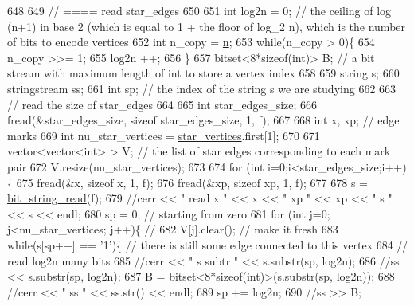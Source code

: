 \begin{DoxyCode}
648 
649   \textcolor{comment}{// ==== read star\_edges}
650 
651   \textcolor{keywordtype}{int} log2n = 0; \textcolor{comment}{// the ceiling of log (n+1) in base 2 (which is equal to 1 + the floor of log\_2 n), which
       is the number of bits to encode vertices}
652   \textcolor{keywordtype}{int} n\_copy = \hyperlink{classmarked__graph__compressed_a8d841016ddb11cfd33748c8deb6277ba}{n};
653   \textcolor{keywordflow}{while}(n\_copy > 0)\{
654     n\_copy >>= 1;
655     log2n ++;
656   \}
657   bitset<8*sizeof(int)> B; \textcolor{comment}{// a bit stream with maximum length of int to store a vertex index}
658 
659   \textcolor{keywordtype}{string} s;
660   stringstream ss;
661   \textcolor{keywordtype}{int} sp; \textcolor{comment}{// the index of the string s we are studying }
662 
663   \textcolor{comment}{// read the size of star\_edges}
664 
665   \textcolor{keywordtype}{int} star\_edges\_size;
666   fread(&star\_edges\_size, \textcolor{keyword}{sizeof} star\_edges\_size, 1, f);
667 
668   \textcolor{keywordtype}{int} x, xp; \textcolor{comment}{// edge marks}
669   \textcolor{keywordtype}{int} nu\_star\_vertices = \hyperlink{classmarked__graph__compressed_a7a4ced4586e2e353f9076bd447df5208}{star\_vertices}.first[1];
670 
671   vector<vector<int> > V; \textcolor{comment}{// the list of star edges corresponding to each mark pair}
672   V.resize(nu\_star\_vertices);
673 
674   \textcolor{keywordflow}{for} (\textcolor{keywordtype}{int} i=0;i<star\_edges\_size;i++)\{
675     fread(&x, \textcolor{keyword}{sizeof} x, 1, f);
676     fread(&xp, \textcolor{keyword}{sizeof} xp, 1, f);
677   
678     s = \hyperlink{compression__helper_8cpp_a40e8dcbc036f96b28e003e882c4890b7}{bit\_string\_read}(f);
679     \textcolor{comment}{//cerr << " read  x " << x << " xp " << xp << " s " << s << endl;}
680     sp = 0; \textcolor{comment}{// starting from zero }
681     \textcolor{keywordflow}{for} (\textcolor{keywordtype}{int} j=0; j<nu\_star\_vertices; j++)\{ \textcolor{comment}{// }
682       V[j].clear(); \textcolor{comment}{// make it fresh}
683       \textcolor{keywordflow}{while}(s[sp++] == \textcolor{charliteral}{'1'})\{ \textcolor{comment}{// there is still some edge connected to this vertex }
684         \textcolor{comment}{// read log2n many bits}
685         \textcolor{comment}{//cerr << " s subtr " << s.substr(sp, log2n);}
686         \textcolor{comment}{//ss << s.substr(sp, log2n);}
687         B = bitset<8*sizeof(int)>(s.substr(sp, log2n));
688         \textcolor{comment}{//cerr << " ss " << ss.str() << endl;}
689         sp += log2n;
690         \textcolor{comment}{//ss >> B;}

\end{DoxyCode}
